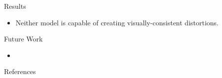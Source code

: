 \documentclass[final]{beamer}
\newlength{\sepwidth}
\newlength{\colwidth}
\newcommand{\separatorcolumn}{\begin{column}{\sepwidth}\end{column}}
\begin{document}
\begin{frame}[t]
\begin{columns}[t]
\begin{column}{\colwidth}
    \end{column}

    \separatorcolumn

    \begin{column}{\colwidth}

      \begin{block}{Results}
        \begin{itemize}
          \item Neither model is capable of creating visually-consistent distortions.
        \end{itemize}

      \end{block}

      \begin{block}{Future Work}
        \begin{itemize}
          \item
        \end{itemize}

      \end{block}

      \begin{block}{References}

        \nocite{*}
        \footnotesize{}

      \end{block}

    \end{column}

    \separatorcolumn
  \end{columns}
\end{frame}
\end{document}
